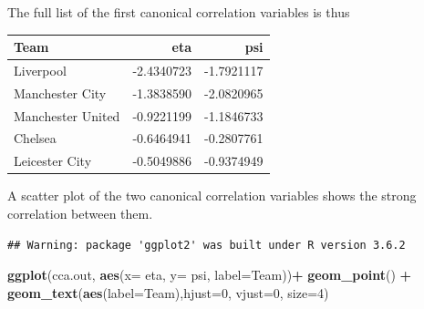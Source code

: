 \documentclass[]{book}
\newenvironment{Shaded}{\begin{snugshade}}{\end{snugshade}}
\newcommand{\CommentTok}[1]{\textcolor[rgb]{0.56,0.35,0.01}{\textit{#1}}}
\newcommand{\DataTypeTok}[1]{\textcolor[rgb]{0.13,0.29,0.53}{#1}}
\newcommand{\DecValTok}[1]{\textcolor[rgb]{0.00,0.00,0.81}{#1}}
\newcommand{\KeywordTok}[1]{\textcolor[rgb]{0.13,0.29,0.53}{\textbf{#1}}}
\newcommand{\NormalTok}[1]{#1}
\newcommand{\OperatorTok}[1]{\textcolor[rgb]{0.81,0.36,0.00}{\textbf{#1}}}
\newcommand{\StringTok}[1]{\textcolor[rgb]{0.31,0.60,0.02}{#1}}
\theoremstyle{definition}
\theoremstyle{definition}
\theoremstyle{definition}
\theoremstyle{remark}
\begin{document}
The full list of the first canonical correlation variables is thus

\begin{Shaded}
\end{Shaded}

\begin{tabular}{lrr}
\toprule
Team & eta & psi\\
\midrule
Liverpool & -2.4340723 & -1.7921117\\
Manchester City & -1.3838590 & -2.0820965\\
Manchester United & -0.9221199 & -1.1846733\\
Chelsea & -0.6464941 & -0.2807761\\
Leicester City & -0.5049886 & -0.9374949\\
\bottomrule
\end{tabular}

A scatter plot of the two canonical correlation variables shows the strong correlation between them.

\begin{Shaded}
\end{Shaded}

\begin{verbatim}
## Warning: package 'ggplot2' was built under R version 3.6.2
\end{verbatim}

\begin{Shaded}
\begin{Highlighting}[]
\KeywordTok{ggplot}\NormalTok{(cca.out, }\KeywordTok{aes}\NormalTok{(}\DataTypeTok{x=}\NormalTok{ eta, }\DataTypeTok{y=}\NormalTok{ psi, }\DataTypeTok{label=}\NormalTok{Team))}\OperatorTok{+}\StringTok{   }\KeywordTok{geom_point}\NormalTok{() }\OperatorTok{+}
\KeywordTok{geom_text}\NormalTok{(}\KeywordTok{aes}\NormalTok{(}\DataTypeTok{label=}\NormalTok{Team),}\DataTypeTok{hjust=}\DecValTok{0}\NormalTok{, }\DataTypeTok{vjust=}\DecValTok{0}\NormalTok{, }\DataTypeTok{size=}\DecValTok{4}\NormalTok{)}
\end{Highlighting}
\end{Shaded}
\end{document}

